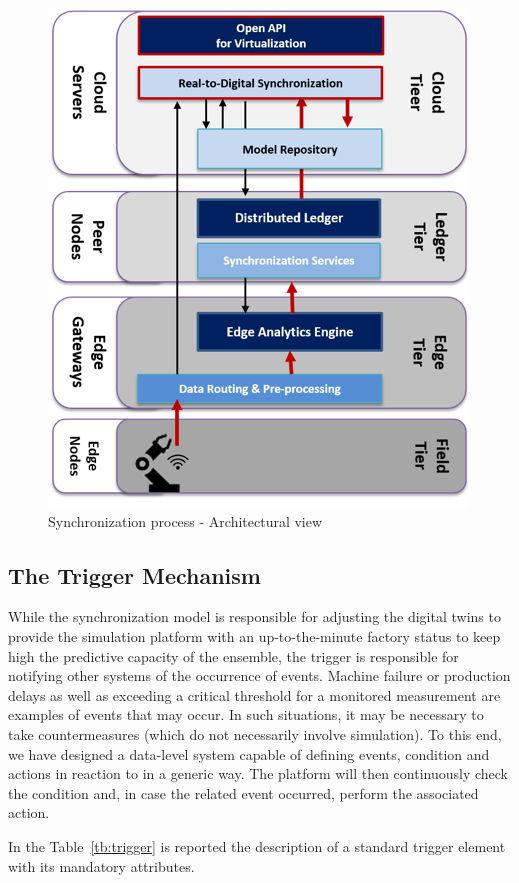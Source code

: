 \begin{figure}
	\centering
	\includegraphics[width=0.7\linewidth]{images/R2DS}
	\caption{Synchronization process - Architectural view}
	\label{fig:r2ds}
\end{figure}


\subsection{The Trigger Mechanism}
While the synchronization model is responsible for adjusting the digital twins to provide the simulation platform with an up-to-the-minute factory status to keep high the predictive capacity of the ensemble, the trigger is responsible for notifying other systems of the occurrence of events. Machine failure or production delays as well as exceeding a critical threshold for a monitored measurement are examples of events that may occur. In such situations, it may be necessary to take countermeasures (which do not necessarily involve simulation). To this end, we have designed a data-level system capable of defining events, condition and actions in reaction to  in a generic way. The platform will then continuously check the condition and, in case the related event occurred, perform the associated action. 

In the Table~\ref{tb:trigger} is reported the description of a standard trigger element with its mandatory attributes. 

